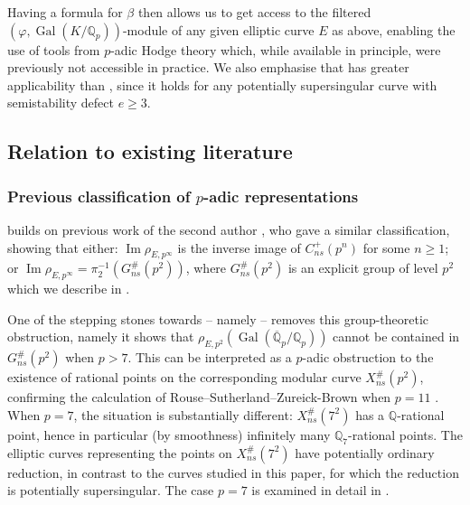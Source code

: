 \documentclass{amsart}
\newcommand{\op}[1]{\operatorname{#1}}
\theoremstyle{definition}
\newcommand{\Q}{\mathbb{Q}}
\newcommand{\Gal}{\operatorname{Gal}}
\numberwithin{theorem}{section}
\numberwithin{equation}{section}
\begin{document}
Having a formula for $\beta$ then allows us to get access to the filtered $(\varphi, \op{Gal}(K/\Q_p))$-module of any given elliptic curve $E$ as above, enabling the use of tools from $p$-adic Hodge theory which, while available in principle, were previously not accessible in practice. We also emphasise that  has greater applicability than , since it holds for any potentially supersingular curve with semistability defect $e \geq 3$.


\subsection{Relation to existing literature}

\subsubsection*{Previous classification of $p$-adic representations}
 builds on previous work of the second author \cite[Theorem 1.6]{furio24}, who gave a similar classification, showing that either: $\operatorname{Im}\rho_{E,p^\infty}$ is the inverse image of $C_{ns}^+(p^n)$ for some $n \geq 1$; or $\operatorname{Im}\rho_{E,p^\infty} = \pi_2^{-1}(G_{ns}^\#(p^2))$, where $G_{ns}^\#(p^2)$ is an explicit group of level $p^2$ which we describe in .

One of the stepping stones towards  -- namely  -- removes this group-theoretic obstruction, namely it shows that $\rho_{E,p^2}(\Gal(\overline{\Q}_p/\Q_p))$ cannot be contained in $G_{ns}^{\#}(p^2)$ when $p>7$. This can be interpreted as a $p$-adic obstruction to the existence of rational points on the corresponding modular curve $X^{\#}_{ns}(p^2)$, confirming the calculation of Rouse--Sutherland--Zureick-Brown when $p=11$ \cite[Section 8.7, label \texttt{121.605.41.1}]{rszb22}.
When $p=7$, the situation is substantially different: $X_{ns}^\#(7^2)$ has a $\Q$-rational point, hence in particular (by smoothness) infinitely many $\Q_7$-rational points. The elliptic curves representing the points on $X_{ns}^\#(7^2)$ have potentially ordinary reduction, in contrast to the curves studied in this paper, for which the reduction is potentially supersingular. The case $p=7$ is examined in detail in \cite{furio20257adicgaloisrepresentationselliptic}.
\end{document}
